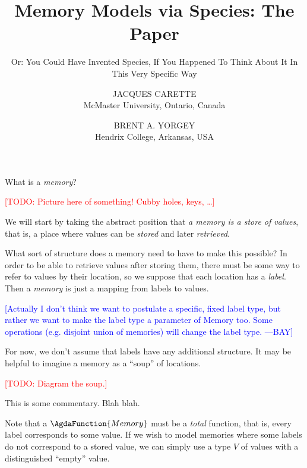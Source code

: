 \documentclass{jfp1}
\title{Memory Models via Species: The Paper}
\subtitle{Or: You Could Have Invented Species, If You Happened To Think
  About It In This Very Specific Way}
\author[J. Carette and B. A. Yorgey]{JACQUES CARETTE\\
  McMaster University, Ontario, Canada \\
  \email{carette@mcmaster.ca}
  \and BRENT A. YORGEY\\
  Hendrix College, Arkansas, USA\\
  \email{yorgey@hendrix.edu}}
\newcommand{\term}[1]{\emph{#1}}
\newcommand{\authornote}[3]{\textcolor{#1}{[#3 ---#2]}}
\newcommand{\todo}[1]{\textcolor{red}{[TODO: #1]}}
\newcommand{\authornote}[3]{}
\newcommand{\todo}[1]{}
\newcommand{\bay}[1]{\authornote{blue}{BAY}{#1}}
\begin{document}
\maketitle

What is a \term{memory}?

\todo{Picture here of something! Cubby holes, keys, \dots}

We will start by taking the abstract position that \emph{a memory is a
  store of values}, that is, a place where values can be \emph{stored} and
later \emph{retrieved}.

What sort of structure does a memory need to have to make this
possible?  In order to be able to retrieve values after storing them,
there must be some way to refer to values by their location, so we
suppose that each location has a \emph{label}.  Then a \term{memory}
is just a mapping from labels to values.


\bay{Actually I don't think we want to postulate a specific, fixed
  label type, but rather we want to make the label type a parameter of
  Memory too.  Some operations (e.g. disjoint union of memories) will
  change the label type.}

For now, we don't assume that labels have any additional structure.
It may be helpful to imagine a memory as a ``soup'' of locations.

\todo{Diagram the soup.}

\begin{commentary}
  This is some commentary.  Blah blah.
\end{commentary}

Note that a $\AgdaFunction{Memory}$ must be a \emph{total} function,
that is, every label corresponds to some value.  If we wish to model
memories where some labels do not correspond to a stored value, we can
simply use a type $V$ of values with a distinguished ``empty'' value.
\end{document}
